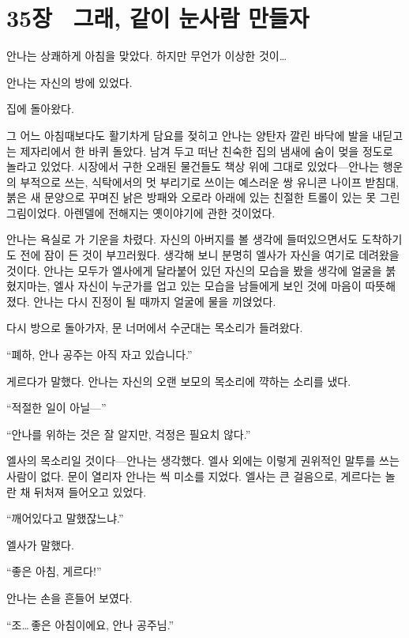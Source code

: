 

\chapter[35장  그래, 같이 눈사람 만들자][35장\hspace*{.5em}그래, 같이 눈사람 만들자]{35장 \ 그래, 같이 눈사람 만들자}



안나는 상쾌하게 아침을 맞았다. 하지만 무언가 이상한 것이\ldots

안나는 자신의 방에 있었다.

집에 돌아왔다.

그 어느 아침때보다도 활기차게 담요를 젖히고 안나는 양탄자 깔린 바닥에 발을 내딛고는 제자리에서 한 바퀴 돌았다. 남겨 두고 떠난 친숙한 집의 냄새에 숨이 멎을 정도로 놀라고 있었다. 시장에서 구한 오래된 물건들도 책상 위에 그대로 있었다—안나는 행운의 부적으로 쓰는, 식탁에서의 멋 부리기로 쓰이는 예스러운 쌍 유니콘 나이프 받침대, 붉은 새 문양으로 꾸며진 낡은 방패와 오로라 아래에 있는 친절한 트롤이 있는 못 그린 그림이었다. 아렌델에 전해지는 옛이야기에 관한 것이었다.

안나는 욕실로 가 기운을 차렸다. 자신의 아버지를 볼 생각에 들떠있으면서도 도착하기도 전에 잠이 든 것이 부끄러웠다. 생각해 보니 분명히 엘사가 자신을 여기로 데려왔을 것이다. 안나는 모두가 엘사에게 달라붙어 있던 자신의 모습을 봤을 생각에 얼굴을 붉혔지마는, 엘사 자신이 누군가를 업고 있는 모습을 남들에게 보인 것에 마음이 따뜻해졌다. 안나는 다시 진정이 될 때까지 얼굴에 물을 끼얹었다.

다시 방으로 돌아가자, 문 너머에서 수군대는 목소리가 들려왔다.

``폐하, 안나 공주는 아직 자고 있습니다.''

게르다가 말했다. 안나는 자신의 오랜 보모의 목소리에 꺅하는 소리를 냈다.

``적절한 일이 아닐—''

``안나를 위하는 것은 잘 알지만, 걱정은 필요치 않다.''

엘사의 목소리일 것이다—안나는 생각했다. 엘사 외에는 이렇게 권위적인 말투를 쓰는 사람이 없다. 문이 열리자 안나는 씩 미소를 지었다. 엘사는 큰 걸음으로, 게르다는 놀란 채 뒤처져 들어오고 있었다.

``깨어있다고 말했잖느냐.''

엘사가 말했다.

``좋은 아침, 게르다!''

안나는 손을 흔들어 보였다.

``조\ldots\,좋은 아침이에요, 안나 공주님.''


